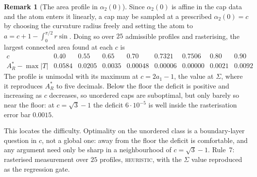 \documentclass[11pt]{article}
\theoremstyle{definition}
\newtheorem{remark}[theorem]{Remark}
\newcommand{\Sig}{\Sigma}
\begin{document}
\begin{remark}[The area profile in $\alpha_2(0)$]\label{rem:profile}
Since $\alpha_2(0)$ is affine in the cap data and the atom enters it linearly, a cap may be
sampled at a prescribed $\alpha_2(0)=c$ by choosing the curvature radius freely and setting
the atom to $a=c+1-\int_0^{\pi/2}r\sin$. Doing so over $25$ admissible profiles and
rasterising, the largest connected area found at each $c$ is
\[
  \begin{array}{r|cccccccc}
    c & 0.40 & 0.55 & 0.65 & 0.70 & 0.7321 & 0.7506 & 0.80 & 0.90\\\hline
    A_R^\ast-\max|T| & 0.0584 & 0.0205 & 0.0035 & 0.00048 & 0.00006 & 0.00000 & 0.0021 & 0.0092
  \end{array}
\]
The profile is unimodal with its maximum at $c=2a_1-1$, the value at $\Sig$, where it
reproduces $A_R^\ast$ to five decimals. Below the floor the deficit is positive and
increasing as $c$ decreases, so unordered caps are suboptimal, but only barely so near the
floor: at $c=\sqrt3-1$ the deficit $6\cdot10^{-5}$ is well inside the rasterisation error
bar $0.0015$.

This locates the difficulty. Optimality on the unordered class is a boundary-layer question
in $c$, not a global one: away from the floor the deficit is comfortable, and any argument
need only be sharp in a neighbourhood of $c=\sqrt3-1$. Rule~7: rasterised measurement over
$25$ profiles, \textsc{heuristic}, with the $\Sig$ value reproduced as the regression gate.
\end{remark}
\end{document}
